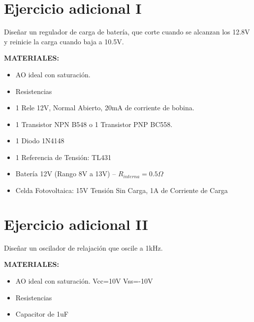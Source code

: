 \documentclass{article}
\begin{document}
\newpage{}
\section{Ejercicio adicional I}
Diseñar un regulador de carga de batería, que corte cuando se alcanzan los 12.8V y reinicie la carga cuando baja a 10.5V.

\textbf{MATERIALES:}
\begin{itemize}
    \item AO ideal con saturación.
    \item Resistencias
 \item 1 Rele 12V, Normal Abierto, 20mA de corriente de bobina.
 \item 1 Transistor NPN B548 o 1 Transistor PNP BC558.
 \item 1 Diodo 1N4148
 \item 1 Referencia de Tensión: TL431
 \item Batería 12V (Rango 8V a 13V) – $R_{interna}=0.5\Omega$
 \item Celda Fotovoltaica: 15V Tensión Sin Carga, 1A de Corriente de Carga
\end{itemize}

\section{Ejercicio adicional II}

Diseñar un oscilador de relajación que oscile a 1kHz.

\textbf{MATERIALES:}
\begin{itemize}
\item AO ideal con saturación. Vcc=10V Vss=-10V
\item Resistencias
\item Capacitor de 1uF

\end{itemize}
\end{document}
